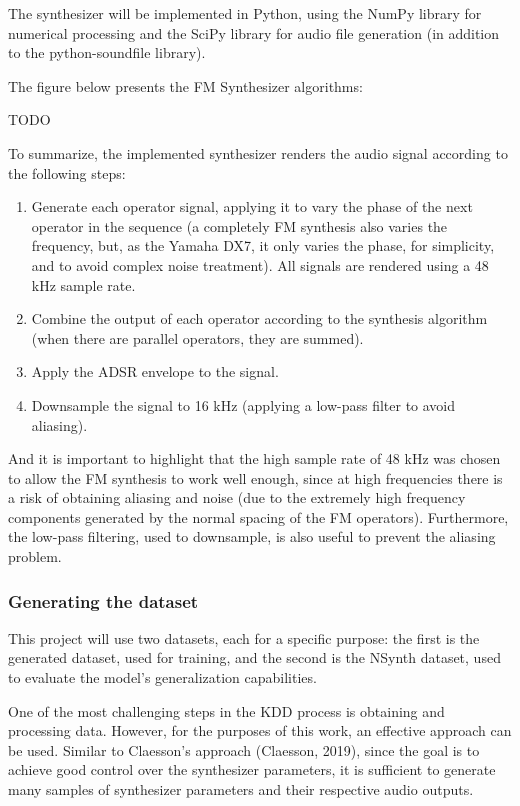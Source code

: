 \documentclass[sigconf,natbib=false]{acmart}
\begin{document}
The synthesizer will be implemented in Python, using the NumPy library for numerical processing and the SciPy library for audio file generation (in addition to the python-soundfile library).

The figure below presents the FM Synthesizer algorithms:

TODO

To summarize, the implemented synthesizer renders the audio signal according to the following steps:

\begin{enumerate}
\item Generate each operator signal, applying it to vary the phase of the next operator in the sequence (a completely FM synthesis also varies the frequency, but, as the Yamaha DX7, it only varies the phase, for simplicity, and to avoid complex noise treatment). All signals are rendered using a 48 kHz sample rate.
\item Combine the output of each operator according to the synthesis algorithm (when there are parallel operators, they are summed).
\item Apply the ADSR envelope to the signal.
\item Downsample the signal to 16 kHz (applying a low-pass filter to avoid aliasing).
\end{enumerate}

And it is important to highlight that the high sample rate of 48 kHz was chosen to allow the FM synthesis to work well enough, since at high frequencies there is a risk of obtaining aliasing and noise (due to the extremely high frequency components generated by the normal spacing of the FM operators). Furthermore, the low-pass filtering, used to downsample, is also useful to prevent the aliasing problem.

\subsubsection{Generating the dataset}

This project will use two datasets, each for a specific purpose: the first is the generated dataset, used for training, and the second is the NSynth dataset, used to evaluate the model's generalization capabilities.

One of the most challenging steps in the KDD process is obtaining and processing data. However, for the purposes of this work, an effective approach can be used. Similar to Claesson's approach (Claesson, 2019), since the goal is to achieve good control over the synthesizer parameters, it is sufficient to generate many samples of synthesizer parameters and their respective audio outputs.
\end{document}
